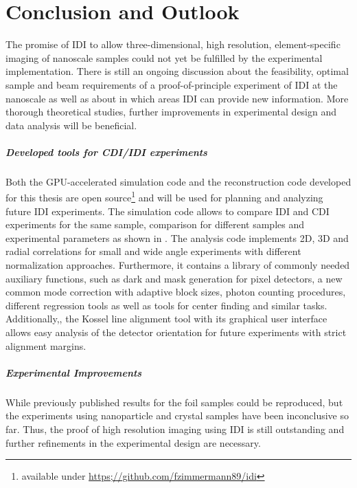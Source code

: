 \chapter{Conclusion and Outlook}
The promise of IDI to allow three-dimensional, high resolution, element-specific imaging of nanoscale samples could not yet be fulfilled by the experimental implementation. There is still an ongoing discussion about the feasibility, optimal sample and beam requirements of a proof-of-principle experiment of IDI at the nanoscale as well as about in which areas IDI can provide new information. More thorough theoretical studies, further improvements in experimental design and data analysis will be beneficial.

\paragraph{Developed tools for CDI/IDI experiments}
Both the GPU-accelerated simulation code and the reconstruction code developed for this thesis are open source\footnote{available under \url{https;//github.com/fzimmermann89/idi}} and will be used for planning and analyzing future IDI experiments. The simulation code allows to compare IDI and CDI experiments for the same sample, comparison for different samples and experimental parameters as shown in .
The analysis code implements 2D, 3D and radial correlations for small and wide angle experiments with different normalization approaches. Furthermore, it contains a library of commonly needed auxiliary functions, such as dark and mask generation for pixel detectors, a new common mode correction with adaptive block sizes, photon counting procedures, different regression tools as well as tools for center finding and similar tasks.
Additionally,, the Kossel line alignment tool with its graphical user interface allows easy analysis of the detector orientation for future experiments with strict alignment margins.

\paragraph{Experimental Improvements}
While previously published results for the foil samples could be reproduced, but the experiments using nanoparticle and crystal samples have been inconclusive so far. Thus, the proof of high resolution imaging using IDI is still outstanding and further refinements in the experimental design are necessary.


